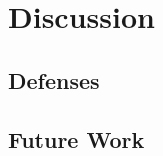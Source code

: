 
\section{Discussion}


\subsection{Defenses}


\subsection{Future Work}
\label{subsec:future-work}





